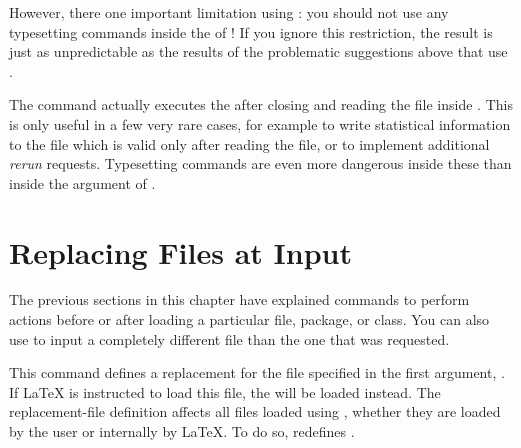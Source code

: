However, there one important limitation using :
you should not use any typesetting commands inside the  of
! If you ignore this restriction, the result is
just as unpredictable as the results of the problematic suggestions above that
use .

The  command
actually executes the  after closing and reading the
 file inside . This is only useful
in a few very rare cases, for example to write statistical information to the
 file which is valid only after reading the  file, or to
implement additional \emph{rerun} requests. Typesetting commands are even more
dangerous inside these  than inside the argument of
.%
%
\EndIndexGroup


\section{Replacing Files at Input}

The previous sections in this chapter have explained commands to perform
actions before or after loading a particular file, package, or class. You can
also use  to input a completely different file than the one
that was requested.


\begin{Declaration}
\end{Declaration}%
This command defines a replacement for
the file specified in the first argument, . If \LaTeX{}
is instructed to load this file, the  will be loaded
instead. The replacement-file definition affects all files loaded using
, whether they are loaded by the user or internally
by \LaTeX{}. To do so,  redefines .


